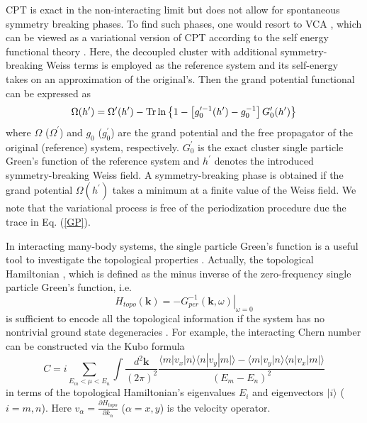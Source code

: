 \documentclass[12pt]{iopart}
\begin{document}
\par CPT is exact in the non-interacting limit but does not allow for spontaneous symmetry breaking phases. To find such phases, one would resort to VCA \cite{PAD_PRL2003}, which can be viewed as a variational version of CPT according to the self energy functional theory \cite{P_EPJB2003}. Here, the decoupled cluster with additional symmetry-breaking Weiss terms is employed as the reference system and its self-energy takes on an approximation of the original's. Then the grand potential functional can be expressed as
\begin{equation}\label{GP}
\Omega(h^\prime)=\Omega^\prime(h^\prime)-\mathop{\mathrm{Tr}}\nolimits\ln\left\{1-\left[g_0^{\prime-1}(h^\prime)-g_0^{-1}\right]G^\prime_0(h^\prime)\right\}
\end{equation}
where $\Omega$ ($\Omega^\prime$) and $g_0$ ($g_0^\prime$) are the grand potential and the free propagator of the original (reference) system, respectively. $G^\prime_0$ is the exact cluster single particle Green's function of the reference system and $h^\prime$ denotes the introduced symmetry-breaking Weiss field. A symmetry-breaking phase is obtained if the grand potential $\Omega(h^\prime)$ takes a minimum at a finite value of the Weiss field. We note that the variational process is free of the periodization procedure due the trace in Eq. (\ref{GP}).

\par In interacting many-body systems, the single particle Green's function is a useful tool to investigate the topological properties \cite{V2003,G_PRB2011,WZ_PRX2012}. Actually, the topological Hamiltonian \cite{WY_JPCM2013}, which is defined as the minus inverse of the zero-frequency single particle Green's function, i.e.
\begin{equation}\label{TH}
H_{topo}(\mathbf{k})=\left.-G_{per}^{-1}(\mathbf{k},\omega)\right|_{\omega=0}
\end{equation}
is sufficient to encode all the topological information if the system has no nontrivial ground state degeneracies \cite{WZ_PRX2012}. For example, the interacting Chern number can be constructed via the Kubo formula \cite{TKNN_PRL1982}
\begin{equation}\label{KF}
C=i\sum_{E_m<\mu<E_n} \int\frac{d^2\mathbf{k}}{(2\pi)^2} \frac{\langle m|v_x|n\rangle\langle n|v_y|m|\rangle-\langle m|v_y|n\rangle\langle n|v_x|m|\rangle}{(E_m-E_n)^2}
\end{equation}
in terms of the topological Hamiltonian's eigenvalues $E_i$ and eigenvectors $|i\rangle$ ($i=m,n$). Here $v_\alpha=\frac{\partial H_{topo}}{\partial k_\alpha}$ ($\alpha=x,y$) is the velocity operator.
\end{document}
